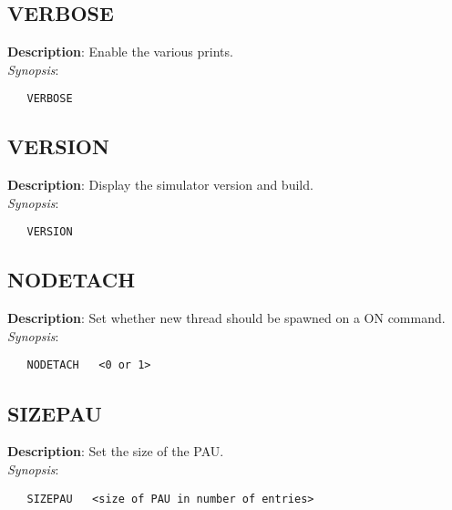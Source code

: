\subsection{\bf VERBOSE}
\label{manpages:VERBOSE}
\label{manpages:verbose}
\vspace{-0.2in}
{\bf Description}: 	Enable the various prints.\\[1.5ex]
{\em Synopsis}:
\vspace{-0.2in}
\scriptsize
\begin{verbatim}
   VERBOSE   						
\end{verbatim}
\normalsize
\vspace{-0.2in}


\subsection{\bf VERSION}
\label{manpages:VERSION}
\label{manpages:version}
\vspace{-0.2in}
{\bf Description}: 	Display the simulator version and build.\\[1.5ex]
{\em Synopsis}:
\vspace{-0.2in}
\scriptsize
\begin{verbatim}
   VERSION   				
\end{verbatim}
\normalsize
\vspace{-0.2in}


\subsection{\bf NODETACH}
\label{manpages:NODETACH}
\label{manpages:nodetach}
\vspace{-0.2in}
{\bf Description}:      Set whether new thread should be spawned on a ON command.\\[1.5ex]
{\em Synopsis}:
\vspace{-0.2in}
\scriptsize
\begin{verbatim}
   NODETACH   <0 or 1>	
\end{verbatim}
\normalsize
\vspace{-0.2in}


\subsection{\bf SIZEPAU}
\label{manpages:SIZEPAU}
\label{manpages:sizepau}
\vspace{-0.2in}
{\bf Description}:      Set the size of the PAU.\\[1.5ex]
{\em Synopsis}:
\vspace{-0.2in}
\scriptsize
\begin{verbatim}
   SIZEPAU   <size of PAU in number of entries>            
\end{verbatim}
\normalsize
\vspace{-0.2in}


